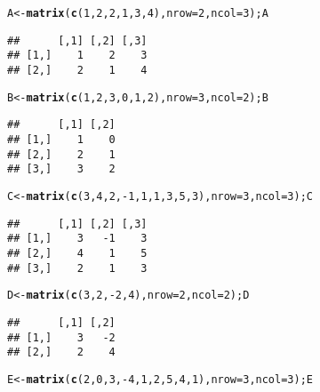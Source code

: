 \documentclass{article}\usepackage[]{graphicx}\usepackage[]{color}
\makeatletter
\newcommand{\hlnum}[1]{\textcolor[rgb]{0.686,0.059,0.569}{#1}}%
\newcommand{\hlopt}[1]{\textcolor[rgb]{0,0,0}{#1}}%
\newcommand{\hlstd}[1]{\textcolor[rgb]{0.345,0.345,0.345}{#1}}%
\newcommand{\hlkwb}[1]{\textcolor[rgb]{0.69,0.353,0.396}{#1}}%
\newcommand{\hlkwc}[1]{\textcolor[rgb]{0.333,0.667,0.333}{#1}}%
\newcommand{\hlkwd}[1]{\textcolor[rgb]{0.737,0.353,0.396}{\textbf{#1}}}%
\newenvironment{kframe}{%
 \def\at@end@of@kframe{}%
 \ifinner\ifhmode%
  \def\at@end@of@kframe{\end{minipage}}%
  \begin{minipage}{\columnwidth}%
 \fi\fi%
 \def\FrameCommand##1{\hskip\@totalleftmargin \hskip-\fboxsep
 \colorbox{shadecolor}{##1}\hskip-\fboxsep
     \hskip-\linewidth \hskip-\@totalleftmargin \hskip\columnwidth}%
 \MakeFramed {\advance\hsize-\width
   \@totalleftmargin\z@ \linewidth\hsize
   \@setminipage}}%
 {\par\unskip\endMakeFramed%
 \at@end@of@kframe}
\newenvironment{knitrout}{}{} %
\makeatother
\begin{document}
\begin{knitrout}
\color{fgcolor}\begin{kframe}
\begin{alltt}
\hlstd{A} \hlkwb{<-} \hlkwd{matrix}\hlstd{(}\hlkwd{c}\hlstd{(}\hlnum{1}\hlstd{,} \hlnum{2}\hlstd{,} \hlnum{2}\hlstd{,} \hlnum{1}\hlstd{,} \hlnum{3}\hlstd{,} \hlnum{4}\hlstd{),} \hlkwc{nrow}\hlstd{=}\hlnum{2}\hlstd{,} \hlkwc{ncol}\hlstd{=}\hlnum{3}\hlstd{);A}
\end{alltt}
\begin{verbatim}
##      [,1] [,2] [,3]
## [1,]    1    2    3
## [2,]    2    1    4
\end{verbatim}
\begin{alltt}
\hlstd{B} \hlkwb{<-} \hlkwd{matrix}\hlstd{(}\hlkwd{c}\hlstd{(}\hlnum{1}\hlstd{,} \hlnum{2}\hlstd{,} \hlnum{3}\hlstd{,} \hlnum{0}\hlstd{,} \hlnum{1}\hlstd{,} \hlnum{2}\hlstd{),} \hlkwc{nrow}\hlstd{=}\hlnum{3}\hlstd{,} \hlkwc{ncol}\hlstd{=}\hlnum{2}\hlstd{);B}
\end{alltt}
\begin{verbatim}
##      [,1] [,2]
## [1,]    1    0
## [2,]    2    1
## [3,]    3    2
\end{verbatim}
\begin{alltt}
\hlstd{C} \hlkwb{<-} \hlkwd{matrix}\hlstd{(}\hlkwd{c}\hlstd{(}\hlnum{3}\hlstd{,}\hlnum{4}\hlstd{,}\hlnum{2}\hlstd{,}\hlopt{-}\hlnum{1}\hlstd{,}\hlnum{1}\hlstd{,}\hlnum{1}\hlstd{,}\hlnum{3}\hlstd{,}\hlnum{5}\hlstd{,}\hlnum{3}\hlstd{),} \hlkwc{nrow}\hlstd{=}\hlnum{3}\hlstd{,} \hlkwc{ncol}\hlstd{=}\hlnum{3}\hlstd{);C}
\end{alltt}
\begin{verbatim}
##      [,1] [,2] [,3]
## [1,]    3   -1    3
## [2,]    4    1    5
## [3,]    2    1    3
\end{verbatim}
\begin{alltt}
\hlstd{D} \hlkwb{<-} \hlkwd{matrix}\hlstd{(}\hlkwd{c}\hlstd{(}\hlnum{3}\hlstd{,} \hlnum{2}\hlstd{,} \hlopt{-}\hlnum{2}\hlstd{,} \hlnum{4}\hlstd{),} \hlkwc{nrow}\hlstd{=}\hlnum{2}\hlstd{,} \hlkwc{ncol}\hlstd{=}\hlnum{2}\hlstd{);D}
\end{alltt}
\begin{verbatim}
##      [,1] [,2]
## [1,]    3   -2
## [2,]    2    4
\end{verbatim}
\begin{alltt}
\hlstd{E} \hlkwb{<-} \hlkwd{matrix}\hlstd{(}\hlkwd{c}\hlstd{(}\hlnum{2}\hlstd{,}\hlnum{0}\hlstd{,}\hlnum{3}\hlstd{,}\hlopt{-}\hlnum{4}\hlstd{,}\hlnum{1}\hlstd{,}\hlnum{2}\hlstd{,}\hlnum{5}\hlstd{,}\hlnum{4}\hlstd{,}\hlnum{1}\hlstd{),} \hlkwc{nrow}\hlstd{=}\hlnum{3}\hlstd{,} \hlkwc{ncol}\hlstd{=}\hlnum{3}\hlstd{);E}

\end{alltt}
\end{kframe}
\end{knitrout}
\end{document}

